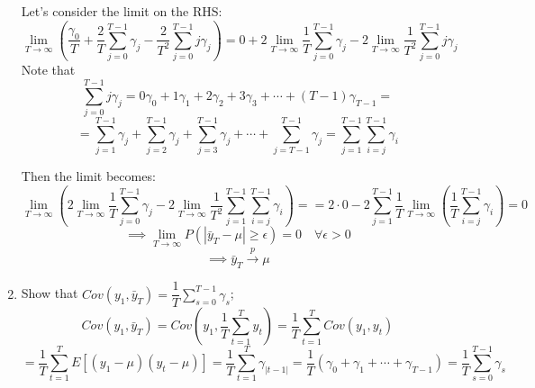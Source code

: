 \documentclass[10pt]{article}
\begin{document}
\begin{enumerate}
			Let's consider the limit on the RHS:
			\[
			\lim\limits_{T\to\infty} \left( \frac{\gamma_0}{T} + \frac{2}{T} \sum\limits_{j=0}^{T-1} \gamma_j - \frac{2}{T^2} \sum\limits_{j=0}^{T-1} j\gamma_j \right) = 0 + 2 \lim\limits_{T\to\infty} \frac{1}{T} \sum\limits_{j=0}^{T-1} \gamma_j - 2 \lim\limits_{T\to\infty} \frac{1}{T^2} \sum\limits_{j=0}^{T-1} j\gamma_j
			\]
			Note that
			\[
			\sum\limits_{j=0}^{T-1} j\gamma_j = 0\gamma_0 + 1\gamma_1 + 2\gamma_2 + 3\gamma_3 + \cdots + (T-1)\gamma_{T-1} = 
			\]
			\[
			= \sum\limits_{j=1}^{T-1} \gamma_j + \sum\limits_{j=2}^{T-1} \gamma_j + \sum\limits_{j=3}^{T-1} \gamma_j + \cdots + \sum\limits_{j=T-1}^{T-1} \gamma_j = \sum\limits_{j=1}^{T-1} \sum\limits_{i=j}^{T-1} \gamma_i
			\]
			
			Then the limit becomes:
			\[
			\lim\limits_{T\to\infty} \left( 2 \lim\limits_{T\to\infty} \frac{1}{T} \sum\limits_{j=0}^{T-1} \gamma_j - 2 \lim\limits_{T\to\infty} \frac{1}{T^2} \sum\limits_{j=1}^{T-1} \sum\limits_{i=j}^{T-1} \gamma_i \right) =
			= 2 \cdot 0 - 2 \sum\limits_{j=1}^{T-1} \frac{1}{T} \lim\limits_{T\to\infty}  \left( \frac{1}{T} \sum\limits_{i=j}^{T-1} \gamma_i \right) = 0
			\]
			\[
			\implies \lim\limits_{T\to\infty} P(|\bar{y}_T - \mu| \ge \epsilon) = 0 \quad \forall \epsilon > 0
			\]
			\[
			\implies \bar{y}_T \xrightarrow{p} \mu
			\]
			
			\item Show that $Cov(y_1, \bar{y}_T) = \dfrac{1}{T} \sum\limits_{s=0}^{T-1} \gamma_s$;
			\[
			Cov(y_1, \bar{y}_T) = Cov\left(y_1, \frac{1}{T} \sum\limits_{t=1}^{T} y_t\right) = \frac{1}{T} \sum\limits_{t=1}^{T} Cov(y_1, y_t)
			\]
			\[
			= \frac{1}{T} \sum\limits_{t=1}^{T} E[(y_1 - \mu)(y_t - \mu)] = \frac{1}{T} \sum\limits_{t=1}^{T} \gamma_{|t-1|} = \frac{1}{T} \left( \gamma_0 + \gamma_1 + \cdots + \gamma_{T-1} \right) = \frac{1}{T} \sum\limits_{s=0}^{T-1} \gamma_s
			\]
			

\end{enumerate}
\end{document}

